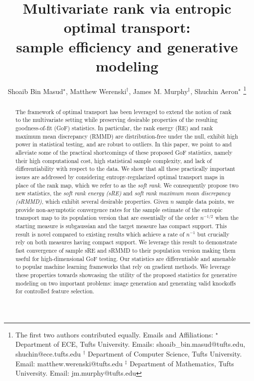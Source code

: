 \documentclass{article}
\title{Multivariate rank via entropic optimal transport: \\sample efficiency and generative modeling}
\author{Shoaib Bin Masud$^{\star}$, Matthew Werenski$^{\dagger}$, James M. Murphy$^{\ddagger}$, Shuchin Aeron$^{\star}$%
  \thanks{The first two authors contributed equally. \newline Emails and Affiliations: \newline $^{\star}$ Department of ECE, Tufts University. Emails:  shoaib\_bin.masud@tufts.edu, shuchin@ece.tufts.edu \newline  $^{\dagger}$ Department of Computer Science, Tufts University. Email: matthew.werenski@tufts.edu \newline $^{\ddagger}$ Department of Mathematics, Tufts University. Email: jm.murphy@tufts.edu } 
  }
\theoremstyle{definition}
\begin{document}
\maketitle
\begin{abstract}

The framework of optimal transport has been leveraged to extend the notion of rank to the multivariate setting while preserving desirable properties of the resulting goodness-of-fit (GoF) statistics. In particular, the rank energy (RE) and rank maximum mean discrepancy (RMMD) are distribution-free under the null, exhibit high power in statistical testing, and are robust to outliers. In this paper, we point to and alleviate some of the practical shortcomings of these proposed GoF statistics, namely their high computational cost, high statistical sample complexity, and lack of differentiability with respect to the data. We show that all these practically important issues are addressed by considering entropy-regularized optimal transport maps in place of the rank map, which we refer to as the \emph{soft rank}. We consequently propose two new statistics, the \emph{soft rank energy (sRE)} and \emph{soft rank maximum mean discrepancy (sRMMD)}, which exhibit several desirable properties. Given $n$ sample data points, we provide non-asymptotic convergence rates for the sample estimate of the entropic transport map to its population version that are essentially of the order $n^{-1/2}$ when the starting measure is subgaussian and the target measure has compact support. This result is novel compared to existing results which achieve a rate of $n^{-1}$ but crucially rely on both measures having compact support. We leverage this result to demonstrate fast convergence of sample sRE and sRMMD to their population version making them useful for high-dimensional GoF testing. Our statistics are differentiable and amenable to popular machine learning frameworks that rely on gradient methods. We leverage these properties towards showcasing the utility of the proposed statistics for generative modeling on two important problems: image generation and generating valid knockoffs for controlled feature selection.

\end{abstract}
\end{document}
